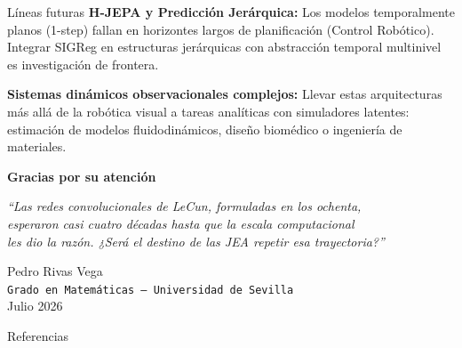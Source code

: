 \documentclass[aspectratio=169, 12pt]{beamer}
\begin{document}
\begin{frame}{Líneas futuras}
\textbf{H-JEPA y Predicción Jerárquica:}
Los modelos temporalmente planos (1-step) fallan en horizontes largos de planificación (Control Robótico). Integrar SIGReg en estructuras jerárquicas con abstracción temporal multinivel es investigación de frontera.

\vspace{0.8cm}
\textbf{Sistemas dinámicos observacionales complejos:}
Llevar estas arquitecturas más allá de la robótica visual a tareas analíticas con simuladores latentes: estimación de modelos fluidodinámicos, diseño biomédico o ingeniería de materiales.
\end{frame}

\begin{frame}[plain]
\vfill
\centering
{\Large\bfseries\color{USred} Gracias por su atención}

\vspace{1cm}
{\large\itshape ``Las redes convolucionales de LeCun, formuladas en los ochenta,\\
esperaron casi cuatro décadas hasta que la escala computacional\\
les dio la razón. ¿Será el destino de las JEA repetir esa trayectoria?''}

\vspace{1cm}
{\normalsize Pedro Rivas Vega\\
\texttt{Grado en Matemáticas — Universidad de Sevilla}\\
Julio 2026}
\vfill
\end{frame}

\begin{frame}[allowframebreaks]{Referencias}
\printbibliography[heading=none]
\end{frame}
\end{document}
